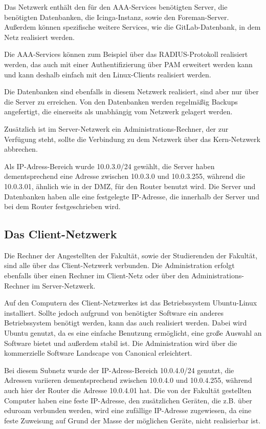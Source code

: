 Das Netzwerk enthält den für den AAA-Services benötigten Server, die benötigten Datenbanken, die Icinga-Instanz, sowie den Foreman-Server. Außerdem können spezifische weitere Services, wie die GitLab-Datenbank, in dem Netz realisiert werden.

Die AAA-Services können zum Beispiel über das RADIUS-Protokoll realisiert werden, das auch mit einer Authentifizierung über PAM erweitert werden kann und kann deshalb einfach mit den Linux-Clients realisiert werden.

Die Datenbanken sind ebenfalls in diesem Netzwerk realisiert, sind aber nur über die Server zu erreichen. Von den Datenbanken werden regelmäßig Backups angefertigt, die einerseits als unabhängig vom Netzwerk gelagert werden.

Zusätzlich ist im Server-Netzwerk ein Administrations-Rechner, der zur Verfügung steht, sollte die Verbindung zu dem Netzwerk über das Kern-Netzwerk abbrechen.

Als IP-Adress-Bereich wurde 10.0.3.0/24 gewählt, die Server haben dementsprechend eine Adresse zwischen 10.0.3.0 und 10.0.3.255, während die 10.0.3.01, ähnlich wie in der DMZ, für den Router benutzt wird. Die Server und Datenbanken haben alle eine festgelegte IP-Adresse, die innerhalb der Server und bei dem Router festgeschrieben wird.

\subsection{Das Client-Netzwerk}
Die Rechner der Angestellten der Fakultät, sowie der Studierenden der Fakultät, sind alle über das Client-Netzwerk verbunden. Die Administration erfolgt ebenfalls über einen Rechner im Client-Netz oder über den Administrations-Rechner im Server-Netzwerk.

Auf den Computern des Client-Netzwerkes ist das Betriebssystem Ubuntu-Linux installiert. Sollte jedoch aufgrund von benötigter Software ein anderes Betriebssystem benötigt werden, kann das auch realisiert werden. Dabei wird Ubuntu genutzt, da es eine einfache Benutzung ermöglicht, eine große Auswahl an Software bietet und außerdem stabil ist. Die Administration wird über die kommerzielle Software Landscape von Canonical erleichtert.

Bei diesem Subnetz wurde der IP-Adress-Bereich 10.0.4.0/24 genutzt, die Adressen variieren dementsprechend zwischen 10.0.4.0 und 10.0.4.255, während auch hier der Router die Adresse 10.0.4.01 hat. Die von der Fakultät gestellten Computer haben eine feste IP-Adresse, den zusätzlichen Geräten, die z.B. über eduroam verbunden werden, wird eine zufällige IP-Adresse zugewiesen, da eine feste Zuweisung auf Grund der Masse der möglichen Geräte, nicht realisierbar ist.


